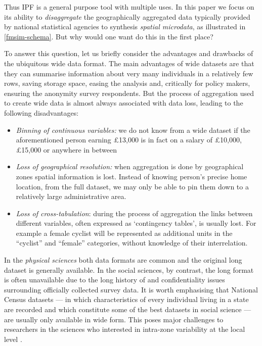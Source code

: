 \documentclass[a4paper,10pt]{article}
\begin{document}
Thus IPF is a general purpose tool with multiple uses. In this paper we focus on its
ability to \emph{disaggregate} the geographically aggregated data typically
provided by national statistical agencies to synthesis \emph{spatial microdata},
as illustrated in \cref{fmsim-schema}. But why would one want do this in the first place?


To answer this question, let us briefly consider the advantages and drawbacks of the ubiquitous wide
data format. The main advantages of wide datasets are that they can summarise information about very many individuals
in a relatively few rows, saving storage space, easing the analysis and, critically for policy makers,
ensuring the anonymity survey respondents. But the process of aggregation
used to create wide data
is almost always associated with data loss, leading to the following disadvantages:
\begin{itemize}
 \item \emph{Binning of continuous variables:} we do
not know from a wide dataset if the aforementioned person earning \pounds13,000 is in fact on a salary of
\pounds10,000, \pounds15,000 or 
anywhere in between
 \item \emph{Loss of geographical resolution:} when aggregation is done by geographical zones
 spatial information is lost. Instead of knowing person's precise home location, from the full dataset, we
may only be able to pin them down to a relatively large administrative area.
 \item \emph{Loss of cross-tabulation}: during the process of
aggregation the links between different variables, often expressed as `contingency tables',
is usually lost. For example a female cyclist will be represented as additional units in the
``cyclist'' and ``female'' categories, without knowledge of their interrelation.
\end{itemize}

In the \emph{physical sciences} both data formats are common and the
original long dataset is generally available. In the social sciences, by contrast, the long format is often unavailable
due to the long history of and confidentiality 
issues surrounding officially collected survey data.
It is worth emphasising that National Census datasets --- in which characteristics of 
every individual living in a state are recorded and which constitute some of the best datasets in social science ---
are usually only available
in wide form. This poses major challenges to researchers in the sciences who
interested in intra-zone variability at the local level \citep{Whitworth2012,Lee2009}.
\end{document}
